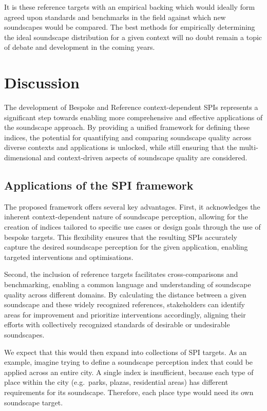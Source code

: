 \documentclass[
  authoryear,
  3p]{elsarticle}
\begin{document}
It is these reference targets with an empirical backing which would
ideally form agreed upon standards and benchmarks in the field against
which new soundscapes would be compared. The best methods for
empirically determining the ideal soundscape distribution for a given
context will no doubt remain a topic of debate and development in the
coming years.

\section{Discussion}\label{sec-discussion}

The development of Bespoke and Reference context-dependent SPIs
represents a significant step towards enabling more comprehensive and
effective applications of the soundscape approach. By providing a
unified framework for defining these indices, the potential for
quantifying and comparing soundscape quality across diverse contexts and
applications is unlocked, while still ensuring that the
multi-dimensional and context-driven aspects of soundscape quality are
considered.

\subsection{Applications of the SPI
framework}\label{applications-of-the-spi-framework}

The proposed framework offers several key advantages. First, it
acknowledges the inherent context-dependent nature of soundscape
perception, allowing for the creation of indices tailored to specific
use cases or design goals through the use of bespoke targets. This
flexibility ensures that the resulting SPIs accurately capture the
desired soundscape perception for the given application, enabling
targeted interventions and optimisations.

Second, the inclusion of reference targets facilitates cross-comparisons
and benchmarking, enabling a common language and understanding of
soundscape quality across different domains. By calculating the distance
between a given soundscape and these widely recognized references,
stakeholders can identify areas for improvement and prioritize
interventions accordingly, aligning their efforts with collectively
recognized standards of desirable or undesirable soundscapes.

We expect that this would then expand into collections of SPI targets.
As an example, imagine trying to define a soundscape perception index
that could be applied across an entire city. A single index is
insufficient, because each type of place within the city (e.g.~parks,
plazas, residential areas) has different requirements for its
soundscape. Therefore, each place type would need its own soundscape
target.
\end{document}
